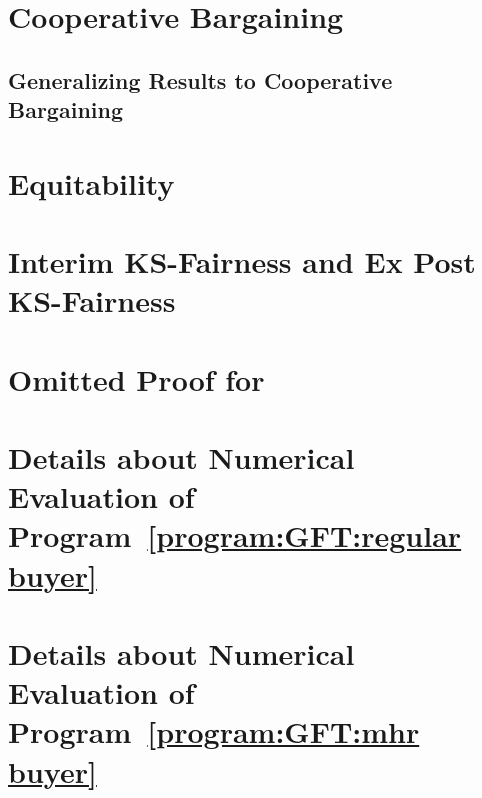 \documentclass[11pt]{article}
\begin{document}

	

\appendix

\section{Cooperative Bargaining}
\label{appendix:bargaining-and-trade}



\subsection{Generalizing  Results to Cooperative Bargaining}
\label{appendix:general-bargaining-results}



\section{Equitability}
\label{appendix:equitablity}



\section{Interim KS-Fairness and Ex Post KS-Fairness} 
\label{subsec:interim ks fairness}


\section{Omitted Proof for }


\section{Details about Numerical Evaluation of Program~\ref{program:GFT:regular buyer}}
\label{apx:numerical evaluation:regular buyer}


\section{Details about Numerical Evaluation of Program~\ref{program:GFT:mhr buyer}}
\label{apx:numerical evaluation:mhr buyer}

\end{document}
